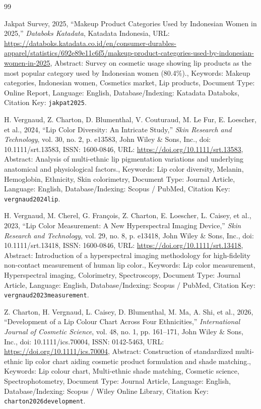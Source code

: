 \documentclass[10pt,a4paper]{article}
\begin{document}
\begingroup
\renewcommand{\section}[2]{}%
\begin{thebibliography}{99}
\fontsize{8pt}{10pt}\selectfont
\setlength{\itemsep}{2pt}
\setlength{\parskip}{0pt}

Jakpat Survey, 2025, ``Makeup Product Categories Used by Indonesian Women in 2025,'' \textit{Databoks Katadata}, Katadata Indonesia, URL: \url{https://databoks.katadata.co.id/en/consumer-durables-apparel/statistics/692e89e11c6f5/makeup-product-categories-used-by-indonesian-women-in-2025}, Abstract: Survey on cosmetic usage showing lip products as the most popular category used by Indonesian women (80.4\%)., Keywords: Makeup categories, Indonesian women, Cosmetics market, Lip products, Document Type: Online Report, Language: English, Database/Indexing: Katadata Databoks, Citation Key: \texttt{jakpat2025}.

H. Vergnaud, Z. Charton, D. Blumenthal, V. Couturaud, M. Le Fur, E. Loescher, et al., 2024, ``Lip Color Diversity: An Intricate Study,'' \textit{Skin Research and Technology}, vol. 30, no. 2, p. e13583, John Wiley \& Sons, Inc., doi: 10.1111/srt.13583, ISSN: 1600-0846, URL: \url{https://doi.org/10.1111/srt.13583}, Abstract: Analysis of multi-ethnic lip pigmentation variations and underlying anatomical and physiological factors., Keywords: Lip color diversity, Melanin, Hemoglobin, Ethnicity, Skin colorimetry, Document Type: Journal Article, Language: English, Database/Indexing: Scopus / PubMed, Citation Key: \texttt{vergnaud2024lip}.

H. Vergnaud, M. Cherel, G. Fran\c{c}ois, Z. Charton, E. Loescher, L. Caisey, et al., 2023, ``Lip Color Measurement: A New Hyperspectral Imaging Device,'' \textit{Skin Research and Technology}, vol. 29, no. 8, p. e13418, John Wiley \& Sons, Inc., doi: 10.1111/srt.13418, ISSN: 1600-0846, URL: \url{https://doi.org/10.1111/srt.13418}, Abstract: Introduction of a hyperspectral imaging methodology for high-fidelity non-contact measurement of human lip color., Keywords: Lip color measurement, Hyperspectral imaging, Colorimetry, Spectroscopy, Document Type: Journal Article, Language: English, Database/Indexing: Scopus / PubMed, Citation Key: \texttt{vergnaud2023measurement}.

Z. Charton, H. Vergnaud, L. Caisey, D. Blumenthal, M. Ma, A. Shi, et al., 2026, ``Development of a Lip Colour Chart Across Four Ethnicities,'' \textit{International Journal of Cosmetic Science}, vol. 48, no. 1, pp. 161--171, John Wiley \& Sons, Inc., doi: 10.1111/ics.70004, ISSN: 0142-5463, URL: \url{https://doi.org/10.1111/ics.70004}, Abstract: Construction of standardized multi-ethnic lip color chart aiding cosmetic product formulation and shade matching., Keywords: Lip colour chart, Multi-ethnic shade matching, Cosmetic science, Spectrophotometry, Document Type: Journal Article, Language: English, Database/Indexing: Scopus / Wiley Online Library, Citation Key: \texttt{charton2026development}.


\end{thebibliography}
\end{document}
